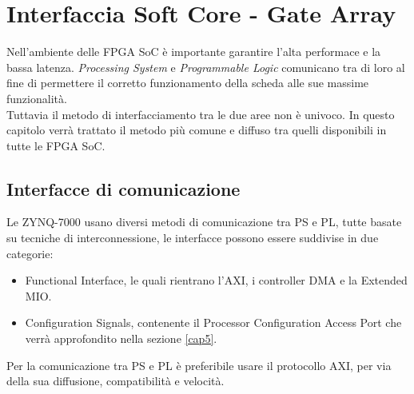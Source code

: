 \chapter{Interfaccia Soft Core - Gate Array}
\label{comunicazioneCap}
Nell'ambiente delle FPGA SoC è importante garantire l'alta performace e la bassa latenza. \textit{Processing System} e \textit{Programmable Logic} comunicano tra di loro al fine di permettere il corretto funzionamento della scheda alle sue massime funzionalità.\\
Tuttavia il metodo di interfacciamento tra le due aree non è univoco. In questo capitolo verrà trattato il metodo più comune e diffuso tra quelli disponibili in tutte le FPGA SoC.
\section{Interfacce di comunicazione}
Le ZYNQ-7000 usano diversi metodi di comunicazione tra PS e PL, tutte basate su tecniche di interconnessione, le interfacce possono essere suddivise in due categorie\cite{Doc}:
\begin{itemize}
    \item Functional Interface, le quali rientrano l'AXI, i controller DMA e la Extended MIO.
    \item Configuration Signals, contenente il Processor Configuration Access Port che verrà approfondito nella sezione \ref{cap5}.
\end{itemize}
Per la comunicazione tra PS e PL è preferibile usare il protocollo AXI, per via della sua diffusione, compatibilità e velocità.
